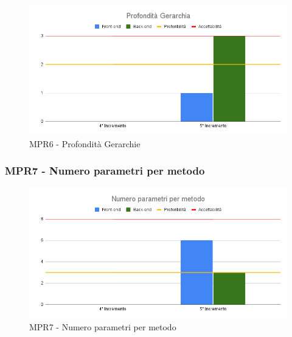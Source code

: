 \begin{figure}[H]
	\centering
	\includegraphics[scale = 0.6]{sezioni/Images/PB/Gerarchia.png}
	\caption{MPR6 - Profondità Gerarchie}
\end{figure}

\subsubsection{MPR7 - Numero parametri per metodo}

\begin{figure}[H]
	\centering
	\includegraphics[scale = 0.6]{sezioni/Images/PB/ParamMetod.png}
	\caption{MPR7 - Numero parametri per metodo}
\end{figure}
